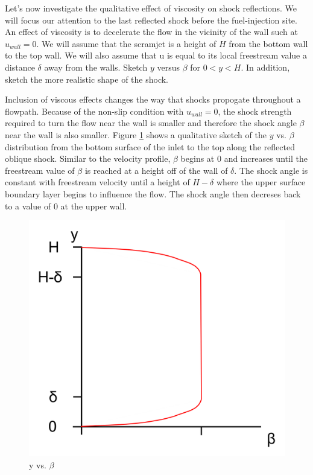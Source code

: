 \documentclass[../main.tex]{subfiles}
\begin{document}

Let's now investigate the qualitative effect of viscosity on shock reflections.
We will focus our attention to the last reflected shock before the fuel-injection site.
An effect of viscosity is to decelerate the flow in the vicinity of the wall such at \(u_{wall}=0\).
We will assume that the scramjet is a height of \(H\) from the bottom wall to the top wall.
We will also assume that u is equal to its local freestream value a distance \(\delta\) away from the walls.
Sketch \(y\) versus \(\beta\) for \(0<y<H\).
In addition, sketch the more realistic shape of the shock.

\discussion{}

Inclusion of viscous effects changes the way that shocks propogate throughout a flowpath.
Because of the non-slip condition with \(u_{wall}=0\), the shock strength required to turn the flow near the wall is smaller and therefore the shock angle \(\beta\) near the wall is also smaller.
Figure \ref{y_vs_beta} shows a qualitative sketch of the \(y\) vs. \(\beta\) distribution from the bottom surface of the inlet to the top along the reflected oblique shock.
Similar to the velocity profile, \(\beta\) begins at 0 and increases until the freestream value of \(\beta\) is reached at a height off of the wall of \(\delta\).
The shock angle is constant with freestream velocity until a height of \(H-\delta\) where the upper surface boundary layer begins to influence the flow.
The shock angle then decreses back to a value of 0 at the upper wall.

\begin{figure}[h!]
    \centering
    \includegraphics[scale=1.0]{../../images/problem_3/y_vs_beta.png}
    \caption{y vs. \(\beta\)}
    \label{y_vs_beta}
\end{figure}
\end{document}
